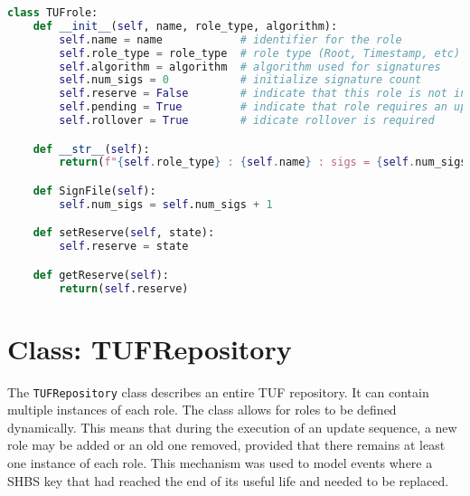 \documentclass{article}
\begin{document}
\begin{lstlisting}[language=Python, basicstyle=\tiny]
class TUFrole:
    def __init__(self, name, role_type, algorithm):
        self.name = name            # identifier for the role
        self.role_type = role_type  # role type (Root, Timestamp, etc)
        self.algorithm = algorithm  # algorithm used for signatures
        self.num_sigs = 0           # initialize signature count
        self.reserve = False        # indicate that this role is not in reserve
        self.pending = True         # indicate that role requires an update
        self.rollover = True        # idicate rollover is required

    def __str__(self):
        return(f"{self.role_type} : {self.name} : sigs = {self.num_sigs}")

    def SignFile(self):
        self.num_sigs = self.num_sigs + 1

    def setReserve(self, state):
        self.reserve = state

    def getReserve(self):
        return(self.reserve)
\end{lstlisting}

\section{Class: TUFRepository}
The \texttt{TUFRepository} class describes an entire TUF repository.  It can contain multiple instances of each role.  The class allows for roles to be defined dynamically.  This means that during the execution of an update sequence, a new role may be added or an old one removed, provided that there remains at least one instance of each role.  This mechanism was used to model events where a SHBS key that had reached the end of its useful life and needed to be replaced.  
\end{document}
